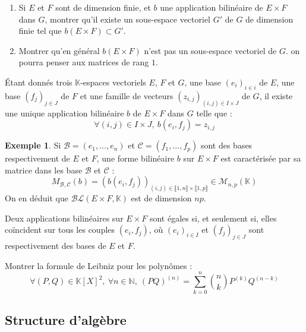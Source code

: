 \documentclass[french]{article}
\newcommand{\N}{\mathbb{N}}
\newcommand{\K}{\mathbb{K}}
\theoremstyle{plain}
\theoremstyle{definition}
\newtheorem*{ex}{Exemple}
\theoremstyle{remark}
\begin{document}
\begin{exo}
	\begin{enumerate}
		\item Si $E$ et $F$ sont de dimension finie, et $b$ une application bilinéaire de $E\times F$ dans $G$, montrer qu'il existe un sous-espace vectoriel $G'$ de $G$ de dimension finie tel que $b(E\times F)\subset G'$.
		\item Montrer qu'en général $b(E\times F)$ n'est pas un sous-espace vectoriel de $G$. on pourra penser aux matrices de rang $1$.
	\end{enumerate}
\end{exo}

\begin{prop}%
	Étant donnés trois $\K$-espaces vectoriels $E$, $F$ et $G$, une base $(e_i)_{i\in i}$ de $E$, une base $(f_j)_{j\in J}$ de $F$ et une famille de vecteurs $(z_{i,j})_{(i,j)\in I\times J}$ de $G$, il existe une unique application bilinéaire $b$ de $E\times F$ dans $G$ telle que :
	$$\forall (i,j)\in I\times J,\ b(e_i,f_j)=z_{i,j}$$
\end{prop}

\begin{ex}
	Si $\mathcal{B}=(e_1,\ldots,e_n)$ et $\mathcal{C}=(f_1,\ldots,f_p)$ sont des bases respectivement de $E$ et $F$, une forme bilinéaire $b$ sur $E\times F$ est caractérisée par sa matrice dans les base $\mathcal{B}$ et $\mathcal{C}$ : $$M_{\mathcal{B},\mathcal{C}}(b)=(b(e_i,f_j))_{(i,j)\in\llbracket1,n\rrbracket\times\llbracket1,p\rrbracket}\in\mathcal{M}_{n,p}(\K)$$ On en déduit que $\mathcal{BL}(E\times F,\K)$ est de dimension $np$.
\end{ex}

\begin{cor}%
	Deux applications bilinéaires sur $E\times F$ sont égales si, et seulement si, elles coïncident sur tous les couples $(e_i,f_j)$, où $(e_i)_{i\in I}$ et $(f_j)_{j\in J}$ sont respectivement des bases de $E$ et $F$.
\end{cor}

\begin{exo}
	Montrer la formule de Leibniz pour les polynômes : $$\forall (P,Q)\in\K[X]^2,\ \forall n\in\N,\ (PQ)^{(n)}=\sum_{k=0}^{n}\binom{n}{k}P^{(k)}Q^{(n-k)}$$
\end{exo}

\subsection{Structure d'algèbre}
\end{document}

